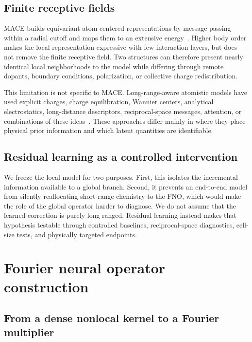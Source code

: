 \documentclass[11pt]{article}
\begin{document}
\subsection{Finite receptive fields}

MACE builds equivariant atom-centered representations by message passing within
a radial cutoff and maps them to an extensive energy~\citep{batatia2022mace}.
Higher body order makes the local representation
expressive with few interaction layers, but does not remove the finite
receptive field. Two structures can therefore present nearly identical local
neighborhoods to the model while differing through remote dopants, boundary
conditions, polarization, or collective charge redistribution.

This limitation is not specific to MACE. Long-range-aware atomistic models
have used explicit charges, charge equilibration, Wannier centers, analytical
electrostatics, long-distance descriptors, reciprocal-space messages,
attention, or combinations of these ideas~\citep{grisafi2019longrange,ko2021fourth,zeng2022dplr,
unke2021spookynet,kosmala2023ewaldmp,faller2024density}. These approaches differ mainly in
where they place physical prior information and which latent quantities are
identifiable.

\subsection{Residual learning as a controlled intervention}

We freeze the local model for two purposes. First, this isolates the
incremental information available to a global branch. Second, it prevents an
end-to-end model from silently reallocating short-range chemistry to the FNO,
which would make the role of the global operator harder to diagnose. We do
not assume that the learned correction is purely long ranged. Residual
learning instead makes that hypothesis testable through controlled baselines,
reciprocal-space diagnostics, cell-size tests, and physically targeted
endpoints.

\section{Fourier neural operator construction}

\subsection{From a dense nonlocal kernel to a Fourier multiplier}
\end{document}
